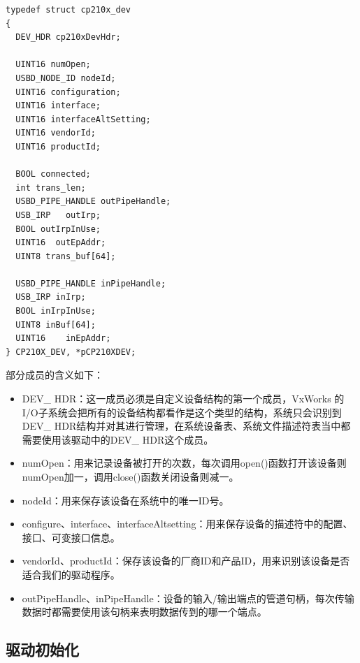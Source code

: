 \lstset{language=C}
\begin{lstlisting}
typedef struct cp210x_dev
{
  DEV_HDR cp210xDevHdr; 
  
  UINT16 numOpen;
  USBD_NODE_ID nodeId;
  UINT16 configuration;	
  UINT16 interface; 
  UINT16 interfaceAltSetting;
  UINT16 vendorId;
  UINT16 productId;

  BOOL connected;  
  int trans_len;
  USBD_PIPE_HANDLE outPipeHandle; 
  USB_IRP	outIrp; 
  BOOL outIrpInUse; 
  UINT16  outEpAddr;
  UINT8 trans_buf[64];

  USBD_PIPE_HANDLE inPipeHandle;
  USB_IRP inIrp;
  BOOL inIrpInUse;
  UINT8 inBuf[64];
  UINT16 	inEpAddr;
} CP210X_DEV, *pCP210XDEV;
\end{lstlisting}
\noindent 部分成员的含义如下：

\begin{itemize}
\item DEV\_ HDR：这一成员必须是自定义设备结构的第一个成员，VxWorks 的I/O子系统会把所有的设备结构都看作是这个类型的结构，系统只会识别到DEV\_ HDR结构并对其进行管理，在系统设备表、系统文件描述符表当中都需要使用该驱动中的DEV\_ HDR这个成员。
\item numOpen：用来记录设备被打开的次数，每次调用open()函数打开该设备则numOpen加一，调用close()函数关闭设备则减一。
\item nodeId：用来保存该设备在系统中的唯一ID号。
\item configure、interface、interfaceAltsetting：用来保存设备的描述符中的配置、接口、可变接口信息。
\item vendorId、productId：保存该设备的厂商ID和产品ID，用来识别该设备是否适合我们的驱动程序。
\item outPipeHandle、inPipeHandle：设备的输入/输出端点的管道句柄，每次传输数据时都需要使用该句柄来表明数据传到的哪一个端点。
\end{itemize}






\subsection{驱动初始化} 
	
